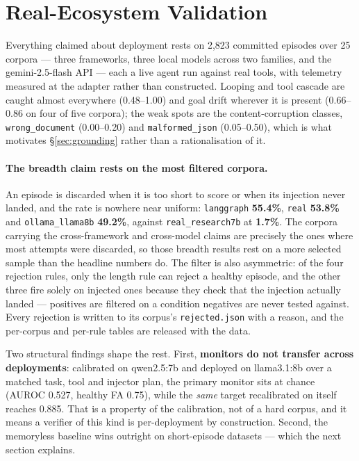 \documentclass{article}
\begin{document}
\section{Real-Ecosystem Validation}
\label{sec:real}

Everything claimed about deployment rests on 2{,}823 committed episodes over 25
corpora --- three frameworks, three local models across two families, and the
gemini-2.5-flash API --- each a live agent run against real tools, with
telemetry measured at the adapter rather than constructed. Looping and tool
cascade are caught almost everywhere (0.48--1.00) and goal drift wherever it is
present (0.66--0.86 on four of five corpora); the weak spots are the
content-corruption classes, \texttt{wrong\_document} (0.00--0.20) and
\texttt{malformed\_json} (0.05--0.50), which is what motivates
\S\ref{sec:grounding} rather than a rationalisation of it.

\paragraph{The breadth claim rests on the most filtered corpora.} An episode is
discarded when it is too short to score or when its injection never landed, and
the rate is nowhere near uniform: \texttt{langgraph} \textbf{55.4\%},
\texttt{real} \textbf{53.8\%} and \texttt{ollama\_llama8b} \textbf{49.2\%},
against \texttt{real\_research7b} at \textbf{1.7\%}. The corpora carrying the
cross-framework and cross-model claims are precisely the ones where most
attempts were discarded, so those breadth results rest on a more selected sample
than the headline numbers do. The filter is also asymmetric: of the four
rejection rules, only the length rule can reject a healthy episode, and the
other three fire solely on injected ones because they check that the injection
actually landed --- positives are filtered on a condition negatives are never
tested against. Every rejection is written to its corpus's
\texttt{rejected.json} with a reason, and the per-corpus and per-rule tables are
released with the data.

Two structural findings shape the rest. First, \textbf{monitors do not transfer
across deployments}: calibrated on qwen2.5:7b and deployed on llama3.1:8b over
a matched task, tool and injector plan, the primary monitor sits at chance
(AUROC 0.527, healthy FA 0.75), while the \emph{same} target recalibrated on
itself reaches 0.885. That is a property of the calibration, not of a hard
corpus, and it means a verifier of this kind is per-deployment by construction.
Second, the memoryless baseline wins outright on short-episode datasets --- which
the next section explains.
\end{document}
